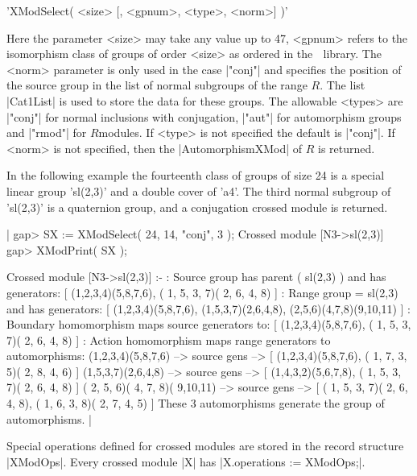 %

'XModSelect( <size> [, <gpnum>, <type>, <norm>] )'

Here the parameter <size> may take any value up to 47,
<gpnum> refers to the isomorphism class of groups of order <size>
as ordered in the \GAP $\;$ library.
The <norm> parameter is only used in the case |"conj"| and specifies
the position of the source group in the list of normal subgroups
of the range $R$.  The list |Cat1List|
is used to store the data for these groups.
The allowable <types> are
|"conj"|   for normal inclusions with conjugation,
|"aut"|  for automorphism groups and
|"rmod"|  for $R$modules.
If <type> is not specified the default is |"conj"|.
If <norm> is not specified, then the  |AutomorphismXMod|  of  $R$
is returned.

In the following example the fourteenth class of groups of size 24
is a special linear group 'sl(2,3)' and a double cover of 'a4'.
The third normal subgroup of 'sl(2,3)' is a quaternion group,
and a conjugation crossed module is returned.

|    gap> SX := XModSelect( 24, 14, "conj", 3 );
    Crossed module [N3->sl(2,3)] 
    gap> XModPrint( SX );

    Crossed module [N3->sl(2,3)] :- 
    : Source group has parent ( sl(2,3) )  and has generators:
      [ (1,2,3,4)(5,8,7,6), ( 1, 5, 3, 7)( 2, 6, 4, 8) ]
    : Range group = sl(2,3)  and has generators:
      [ (1,2,3,4)(5,8,7,6), (1,5,3,7)(2,6,4,8), (2,5,6)(4,7,8)(9,10,11) ]
    : Boundary homomorphism maps source generators to:
      [ (1,2,3,4)(5,8,7,6), ( 1, 5, 3, 7)( 2, 6, 4, 8) ]
    : Action homomorphism maps range generators to automorphisms:
      (1,2,3,4)(5,8,7,6) --> { source gens --> 
    [ (1,2,3,4)(5,8,7,6), ( 1, 7, 3, 5)( 2, 8, 4, 6) ] }
      (1,5,3,7)(2,6,4,8) --> { source gens -->  
    [ (1,4,3,2)(5,6,7,8), ( 1, 5, 3, 7)( 2, 6, 4, 8) ] }
      ( 2, 5, 6)( 4, 7, 8)( 9,10,11) --> { source gens --> 
    [ ( 1, 5, 3, 7)( 2, 6, 4, 8), ( 1, 6, 3, 8)( 2, 7, 4, 5) ] }
      These 3 automorphisms generate the group of automorphisms. |

%

Special operations defined for crossed modules are stored in
the record structure |XModOps|.  Every crossed module |X| has
|X.operations := XModOps;|.

